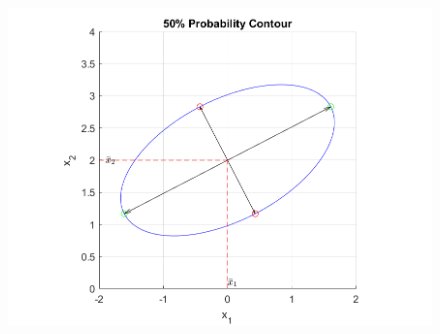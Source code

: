 \begin{enumerate}[label=(\alph*)]
\begin{figure}[H]
    \includegraphics[scale=0.8]{./matlab/chapter-4/sol4.2.png}
\end{figure}
\end{enumerate}